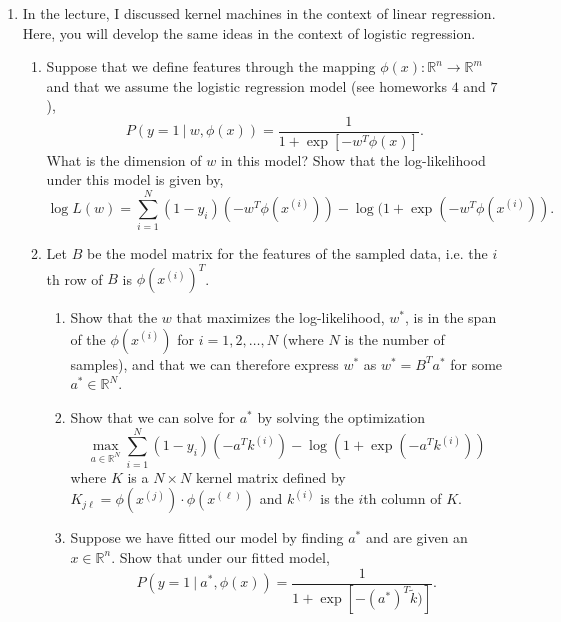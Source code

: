 \documentclass[11pt]{article}
\begin{document}
\begin{enumerate}
%

\item In the lecture, I discussed kernel machines in the context of linear regression.  Here, you will develop the same ideas in the context of logistic regression.
\begin{enumerate}
\item Suppose that we define features through the mapping $\phi(x) : \mathbb{R}^n \to \mathbb{R}^m$ and that we assume the logistic regression model (see homeworks $4$ and $7$),
\begin{equation} \label{mP}
P(y = 1 \ | \ w, \phi(x)) = \frac{1}{1 + \exp[-w^T \phi(x)]}.
\end{equation}
What is the dimension of $w$ in this model?  Show that the log-likelihood under this model is given by,
\begin{equation}  \label{mL}
\log L(w) = \sum_{i=1}^N (1-y_i)(-w^T\phi(x^{(i)})) - \log(1 + \exp(-w^T\phi(x^{(i)})). 
\end{equation}
\item Let $B$ be the model matrix for the features of the sampled data, i.e. the $i$th row of $B$ is $\phi(x^{(i)})^T$.  
\begin{enumerate}
\item Show that  the $w$ that maximizes the log-likelihood, $w^*$, is in the span of the $\phi(x^{(i)})$ for $i=1,2,\dots,N$ (where $N$ is the number of samples), and that we can therefore express $w^*$ as $w^* = B^Ta^*$ for some $a^* \in \mathbb{R}^N$.
\item Show that we can solve for $a^*$ by solving the optimization
\begin{equation}  \label{kL}
\max_{a \in \mathbb{R}^N}  \sum_{i=1}^N (1-y_i)(-a^T k^{(i)}) - \log(1 + \exp(-a^T k^{(i)}))
\end{equation}
where $K$ is a $N \times N$ kernel matrix defined by $K_{j \ell} = \phi(x^{(j)}) \cdot \phi(x^{(\ell)})$ and $k^{(i)}$ is the $i$th column of $K$.
\item Suppose we have fitted our model by finding $a^*$ and are given an $x \in \mathbb{R}^n$.  Show that under our fitted model,
\begin{equation} \label{kP}
P(y = 1 \ | \ a^*, \phi(x)) = \frac{1}{1 + \exp[-(a^*)^T \tilde{k})]}.
\end{equation}

\end{enumerate}
\end{enumerate}
\end{enumerate}
\end{document}
